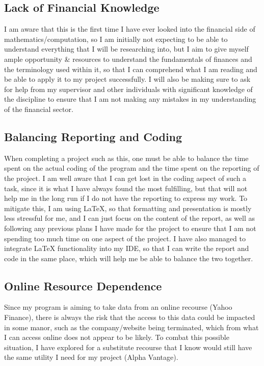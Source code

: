 \documentclass{article}
\begin{document}
\subsection{Lack of Financial Knowledge}
I am aware that this is the first time I have ever looked into the financial side of mathematics/computation, so I am initially not expecting to be able to understand everything that I will be researching into, but I aim to give myself ample opportunity \& resources to understand the fundamentals of finances and the terminology used within it, so that I can comprehend what I am reading and be able to apply it to my project successfully. I will also be making sure to ask for help from my supervisor and other individuals with significant knowledge of the discipline to ensure that I am not making any mistakes in my understanding of the financial sector.

\subsection{Balancing Reporting and Coding}
When completing a project such as this, one must be able to balance the time spent on the actual coding of the program and the time spent on the reporting of the project. I am well aware that I can get lost in the coding aspect of such a task, since it is what I have always found the most fulfilling, but that will not help me in the long run if I do not have the reporting to express my work. To mitigate this, I am using LaTeX, so that formatting and presentation is mostly less stressful for me, and I can just focus on the content of the report, as well as following any previous plans I have made for the project to ensure that I am not spending too much time on one aspect of the project. I have also managed to integrate LaTeX functionality into my IDE, so that I can write the report and code in the same place, which will help me be able to balance the two together.

\subsection{Online Resource Dependence}
Since my program is aiming to take data from an online recourse (Yahoo Finance), there is always the risk that the access to this data could be impacted in some manor, such as the company/website being terminated, which from what I can access online does not appear to be likely. To combat this possible situation, I have explored for a substitute recourse that I know would still have the same utility I need for my project (Alpha Vantage).
\end{document}
